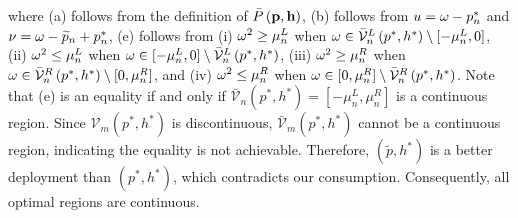 \documentclass[smallabstract,smallcaptions]{dccpaper}
\newcommand{\bP}{\ensuremath{\vp}}          %
\newcommand{\abPo}{\ensuremath{\bar{P}}}  %
\newcommand{\bH}{\ensuremath{\vh}}          %
\newcommand{\Vor}{\ensuremath{\mathcal{V}}}         %
\begin{document}
where (a) follows from the definition of $\abPo\left(\bP,\bH\right)$, (b) follows from $u=\omega-p^*_n$ and $\nu=\omega-\widetilde{p}_n+p^*_n$, (e) follows from (i) $\omega^2\ge\mu^L_n$ when $\ome\in\bar{\Vor}^L_n\left(p^*, h^*\right)\setminus[-\mu^L_n, 0]$, (ii)  $\omega^2\le\mu^L_n$ when $\ome\in[-\mu^L_n, 0]\setminus\bar{\Vor}^L_n\left(p^*, h^*\right)$, (iii) $\omega^2\ge\mu^R_n$ when $\ome\in\bar{\Vor}^R_n\left(p^*, h^*\right)\setminus[0, \mu^R_n]$, and (iv) $\omega^2\le\mu^R_n$ when $\ome\in[0, \mu^R_n]\setminus\bar{\Vor}^R_n\left(p^*, h^*\right)$.
Note that (e) is an equality if and only if $\bar{\Vor}_n\left(p^*, h^*\right)=[-\mu^L_n,\mu^R_n]$ is a continuous region.
Since $\Vor_m\left(p^*, h^*\right)$ is discontinuous, $\bar{\Vor}_m\left(p^*, h^*\right)$ cannot be a continuous region, indicating the equality is not achievable.
Therefore, $(\widetilde{p}, h^*)$ is a better deployment than $(p^*, h^*)$, which contradicts our consumption.
Consequently, all optimal regions are continuous.
\end{document}
